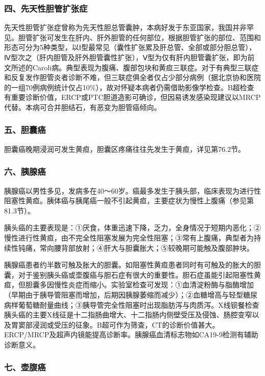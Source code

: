 \subsubsection{四、先天性胆管扩张症}

先天性胆管扩张症曾称为先天性胆总管囊肿，本病好发于东亚国家，我国并非罕见。胆管扩张可发生在肝内、肝外胆管的任何部位，根据胆管扩张的部位、范围和形态可分为5种类型，以Ⅰ型最常见（囊性扩张累及肝总管、全部或部分胆总管），Ⅳ型次之（肝内胆管及肝外胆管囊性扩张），Ⅴ型为仅有肝内胆管囊扩张，即为前文所述的Caroli病。典型表现为腹痛、腹部包块和黄疸三联症。对于有典型三联症和反复发作胆管炎者诊断不难，但三联症俱全者仅占少部分病例（据北京协和医院的一组70例病例统计仅占10\%），故对怀疑本病者仍需借助影像学检查。B超检查有重要诊断价值，ERCP或PTC胆道造影可确诊，但因易诱发感染现建议以MRCP代替。本病可合并胆结石，有恶变为胆管癌倾向。

\subsubsection{五、胆囊癌}

胆囊癌晚期浸润可发生黄疸，胆囊区疼痛往往先发生于黄疸，详见第76.2节。

\subsubsection{六、胰腺癌}

胰腺癌以男性多见，发病多在40～60岁。癌最多发生于胰头部，临床表现为进行性阻塞性黄疸。胰体癌与胰尾癌一般不引起黄疸，主要症状为慢性上腹痛（参见第81.3节）。

胰头癌的主要表现是：①厌食，体重迅速下降，乏力，全身情况于短期内恶化；②慢性进行性黄疸，由不完全性阻塞发展为完全性阻塞；③常有上腹痛，典型者为持续性钝痛，常向腰背部放射；④肝大与胆囊胀大；⑤较晚期可能触及腹部肿块。

胰腺癌患者约半数可触及胀大的胆囊。如阻塞性黄疸患者同时有可触及的胀大的胆囊，对于鉴别胰头癌或壶腹癌与胆石症有很大的重要性。胆石症虽能引起阻塞性黄疸，但胆囊多因慢性炎症而缩小。实验室检查可发现：①血清淀粉酶与脂酶增加（早期由于胰导管阻塞而增加，后期因胰腺萎缩而减少）；②血糖增高与轻型糖尿病样葡萄糖耐量曲线；③胰导管完全性阻塞时出现脂肪泻与肉质泻。X线钡餐检查胰头癌的主要X线征是十二指肠曲增大、十二指肠内侧壁受压及侵蚀、肠腔变窄以及胃窦部浸润或受压的征象。B超可作为筛查，CT的诊断价值甚大。ERCP/MRCP及超声内镜能提高诊断率。胰腺癌血清标志物如CA19-9检测有辅助诊断意义。

\subsubsection{七、壶腹癌}

